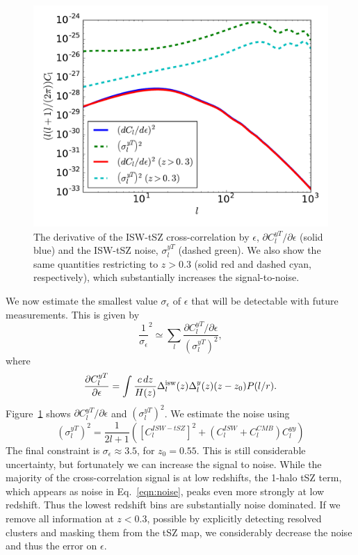 \documentclass[aps,twocolumn,floats,prd,nofootinbib]{revtex4-1}
\begin{document}
\begin{figure}[h]
\includegraphics[width=10 cm, height = 7 cm]{Clbyeps.pdf}
    \caption{The derivative of the ISW-tSZ cross-correlation by $\epsilon$, 
    $\partial C_l^{yT}/\partial \epsilon$ (solid blue) and the ISW-tSZ 
    noise, $\sigma_l^{yT}$ (dashed green). We also show the same quantities 
    restricting to $z>0.3$ (solid red and dashed cyan, respectively), 
    which substantially increases the signal-to-noise.} 
\label{fig:clderiv}
\end{figure}

We now estimate the smallest value $\sigma_\epsilon$ of
$\epsilon$ that will be detectable with future measurements.
This is given by
\begin{equation}
     \frac{1}{\sigma_\epsilon}^2 \simeq \sum_l \frac{ \partial
     C_l^{yT}/\partial \epsilon}{\left(\sigma_l^{yT} \right)^2},
\end{equation}
where
\begin{equation}
     \frac{\partial C_l^{yT}}{\partial \epsilon} = \int
     \frac{c\, dz}{H(z)} \Delta^{\rm isw}_l(z) \Delta^y_l(z)
     (z-z_0) P(l/r).
\label{eqn:Clderiv}
\end{equation}
Figure~\ref{fig:clderiv} shows $\partial C_l^{yT}/\partial \epsilon$ and $\left(\sigma_l^{yT}\right)^2$.
We estimate the noise using~\cite{Taburet:2010hb}
\begin{equation}
    \left(\sigma_l^{yT}\right)^2 = \frac{1}{2 l +1} \left(\left[C_l^{ISW-tSZ}\right]^2 + (C_l^{ISW} + C_l^{CMB}) C_l^{yy}\right)
    \label{eqn:noise}
\end{equation}
The final constraint is $\sigma_\epsilon \approx 3.5$, for $z_0 = 0.55$. This is still 
considerable uncertainty, but fortunately we can increase the signal to noise. 
While the majority of the cross-correlation signal is at low redshifts, 
the 1-halo tSZ term, which appears as noise in Eq.~\ref{eqn:noise}, 
peaks even more strongly at low redshift. Thus the lowest redshift bins 
are substantially noise dominated. If we remove all information at $z < 0.3$,
possible by explicitly detecting resolved clusters and masking them from the tSZ map, 
we considerably decrease the noise and thus the error on $\epsilon$.
\end{document}
